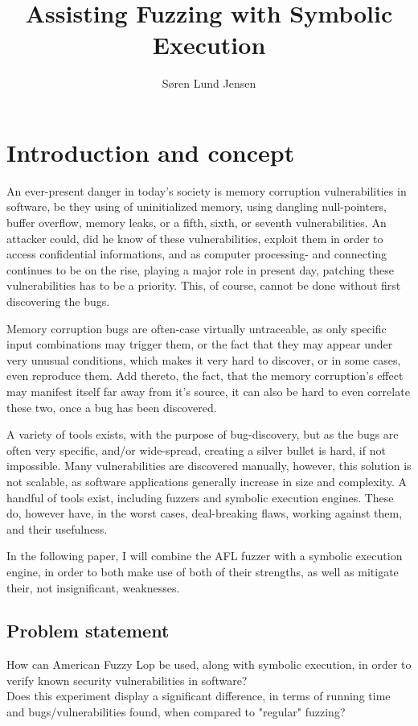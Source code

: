\documentclass[a4paper]{article}
\title{Assisting Fuzzing with Symbolic Execution}
\author{Søren Lund Jensen}
\begin{document}
\maketitle

\tableofcontents

\newpage

\section{Introduction and concept}
An ever-present danger in today's society is memory corruption vulnerabilities in software, be they using of uninitialized memory, using dangling null-pointers, buffer overflow, memory leaks, or a fifth, sixth, or seventh vulnerabilities. An attacker could, did he know of these vulnerabilities, exploit them in order to access confidential informations, and as computer processing- and connecting continues to be on the rise, playing a major role in present day, patching these vulnerabilities has to be a priority. This, of course, cannot be done without first discovering the bugs. 

Memory corruption bugs are often-case virtually untraceable, as only specific input combinations may trigger them, or the fact that they may appear under very unusual conditions, which makes it very hard to discover, or in some cases, even reproduce them. Add thereto, the fact, that the memory corruption's effect may manifest itself far away from it's source, it can also be hard to even correlate these two, once a bug has been discovered.

A variety of tools exists, with the purpose of bug-discovery, but as the bugs are often very specific, and/or wide-spread, creating a silver bullet is hard, if not impossible. Many vulnerabilities are discovered manually, however, this solution is not scalable, as software applications generally increase in size and complexity. A handful of tools exist, including fuzzers and symbolic execution engines. These do, however have, in the worst cases, deal-breaking flaws, working against them, and their usefulness.

In the following paper, I will combine the AFL fuzzer with a symbolic execution engine, in order to both make use of both of their strengths, as well as mitigate their, not insignificant, weaknesses.

\subsection{Problem statement}
How can American Fuzzy Lop be used, along with symbolic execution, in order to verify known security vulnerabilities in software?\\
Does this experiment display a significant difference, in terms of running time and bugs/vulnerabilities found, when compared to "regular" fuzzing?
\newpage
\end{document}
